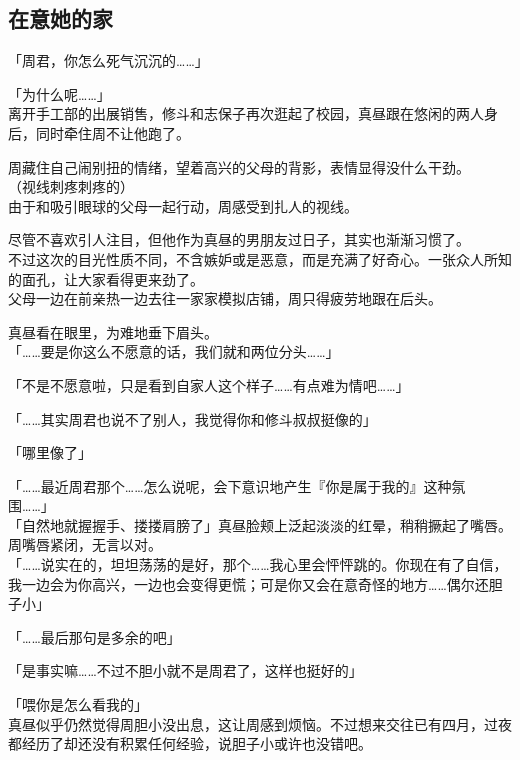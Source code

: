 \subsection{在意她的家}

「周君，你怎么死气沉沉的……」

「为什么呢……」\\

离开手工部的出展销售，修斗和志保子再次逛起了校园，真昼跟在悠闲的两人身后，同时牵住周不让他跑了。

周藏住自己闹别扭的情绪，望着高兴的父母的背影，表情显得没什么干劲。\\

（视线刺疼刺疼的）\\

由于和吸引眼球的父母一起行动，周感受到扎人的视线。

尽管不喜欢引人注目，但他作为真昼的男朋友过日子，其实也渐渐习惯了。\\

不过这次的目光性质不同，不含嫉妒或是恶意，而是充满了好奇心。一张众人所知的面孔，让大家看得更来劲了。\\

父母一边在前亲热一边去往一家家模拟店铺，周只得疲劳地跟在后头。

真昼看在眼里，为难地垂下眉头。\\

「……要是你这么不愿意的话，我们就和两位分头……」

「不是不愿意啦，只是看到自家人这个样子……有点难为情吧……」

「……其实周君也说不了别人，我觉得你和修斗叔叔挺像的」

「哪里像了」

「……最近周君那个……怎么说呢，会下意识地产生『你是属于我的』这种氛围……」\\

「自然地就握握手、搂搂肩膀了」真昼脸颊上泛起淡淡的红晕，稍稍撅起了嘴唇。周嘴唇紧闭，无言以对。\\

「……说实在的，坦坦荡荡的是好，那个……我心里会怦怦跳的。你现在有了自信，我一边会为你高兴，一边也会变得更慌；可是你又会在意奇怪的地方……偶尔还胆子小」

「……最后那句是多余的吧」

「是事实嘛……不过不胆小就不是周君了，这样也挺好的」

「喂你是怎么看我的」\\

真昼似乎仍然觉得周胆小没出息，这让周感到烦恼。不过想来交往已有四月，过夜都经历了却还没有积累任何经验，说胆子小或许也没错吧。

